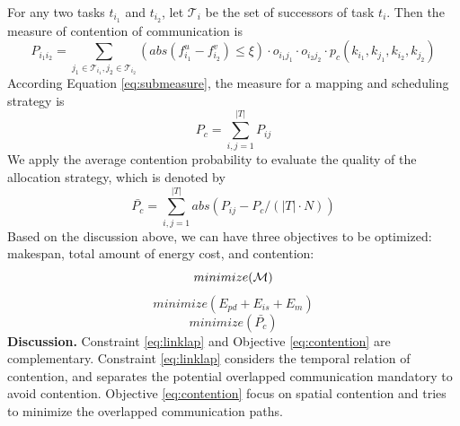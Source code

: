 For any two tasks $t_{i_1}$ and $t_{i_2}$, let ${\mathcal{T}_{i}}$ be the set of successors of task $t_i$. Then the measure of contention of communication is 
\begin{equation}\label{eq:submeasure}
P_{{i_1}{i_2}}=\sum_{j_1\in {\mathcal{T}_{i_1}}, j_2 \in {\mathcal{T}_{i_2}}}(abs(f^u_{i_1} -f^v_{i_2})\leq \xi)\cdot o_{{i_1}{j_1}}\cdot o_{{i_2}{j_2}}\cdot p_c(k_{i_1},k_{j_1},k_{i_2},k_{j_2})
\end{equation}
According Equation \ref{eq:submeasure}, the measure for a mapping and scheduling strategy is 
\begin{equation}
P_c=\sum^{|T|}_{i,j=1} P_{ij}
\end{equation}
We apply the average contention probability to evaluate the quality of the allocation strategy, which is denoted by
\begin{equation}
\bar{P_c}=\sum^{|T|}_{i,j=1}abs(P_{ij}-P_c/(|T|\cdot N))
\end{equation} 
Based on the discussion above, we can have three objectives to be optimized: makespan, total amount of energy cost, and contention:
\begin{equation}\label{eq:makespan}
minimize({\cal{M}})
\end{equation}
\begin{equation}\label{eq:energy}
minimize(E_{pd} +E_{is}+ E_m)
\end{equation}
\begin{equation}\label{eq:contention}
minimize(\bar{P_c})
\end{equation}
\noindent\textbf{Discussion.} 
Constraint \ref{eq:linklap} and Objective \ref{eq:contention} are complementary. Constraint \ref{eq:linklap} considers the temporal relation of contention, and separates the potential overlapped communication mandatory to avoid contention. Objective \ref{eq:contention} focus on spatial contention and tries to minimize the overlapped communication paths. 


